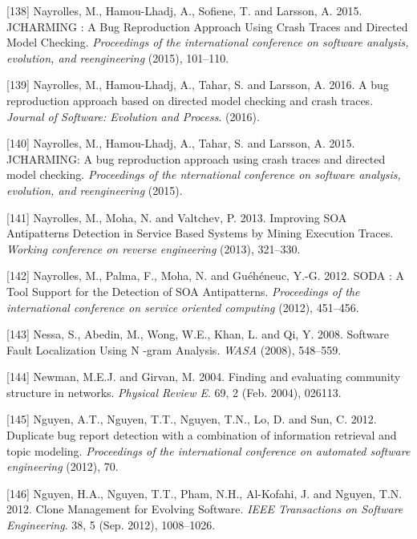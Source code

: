 \documentclass[12pt]{report}
\begin{document}
\hypertarget{ref-Nayrolles2015}{}
{[}138{]} Nayrolles, M., Hamou-Lhadj, A., Sofiene, T. and Larsson, A.
2015. JCHARMING : A Bug Reproduction Approach Using Crash Traces and
Directed Model Checking. \emph{Proceedings of the international
conference on software analysis, evolution, and reengineering} (2015),
101--110.

\hypertarget{ref-Nayrolles2016d}{}
{[}139{]} Nayrolles, M., Hamou-Lhadj, A., Tahar, S. and Larsson, A.
2016. A bug reproduction approach based on directed model checking and
crash traces. \emph{Journal of Software: Evolution and Process}. (2016).

\hypertarget{ref-Nayrolles2015g}{}
{[}140{]} Nayrolles, M., Hamou-Lhadj, A., Tahar, S. and Larsson, A.
2015. JCHARMING: A bug reproduction approach using crash traces and
directed model checking. \emph{Proceedings of the nternational
conference on software analysis, evolution, and reengineering} (2015).

\hypertarget{ref-Nayrolles2013a}{}
{[}141{]} Nayrolles, M., Moha, N. and Valtchev, P. 2013. Improving SOA
Antipatterns Detection in Service Based Systems by Mining Execution
Traces. \emph{Working conference on reverse engineering} (2013),
321--330.

\hypertarget{ref-Nayrolles}{}
{[}142{]} Nayrolles, M., Palma, F., Moha, N. and Guéhéneuc, Y.-G. 2012.
SODA : A Tool Support for the Detection of SOA Antipatterns.
\emph{Proceedings of the international conference on service oriented
computing} (2012), 451--456.

\hypertarget{ref-Nessa2008}{}
{[}143{]} Nessa, S., Abedin, M., Wong, W.E., Khan, L. and Qi, Y. 2008.
Software Fault Localization Using N -gram Analysis. \emph{WASA} (2008),
548--559.

\hypertarget{ref-Newman2004}{}
{[}144{]} Newman, M.E.J. and Girvan, M. 2004. Finding and evaluating
community structure in networks. \emph{Physical Review E}. 69, 2 (Feb.
2004), 026113.

\hypertarget{ref-Nguyen2012}{}
{[}145{]} Nguyen, A.T., Nguyen, T.T., Nguyen, T.N., Lo, D. and Sun, C.
2012. Duplicate bug report detection with a combination of information
retrieval and topic modeling. \emph{Proceedings of the international
conference on automated software engineering} (2012), 70.

\hypertarget{ref-Nguyen2012a}{}
{[}146{]} Nguyen, H.A., Nguyen, T.T., Pham, N.H., Al-Kofahi, J. and
Nguyen, T.N. 2012. Clone Management for Evolving Software. \emph{IEEE
Transactions on Software Engineering}. 38, 5 (Sep. 2012), 1008--1026.
\end{document}
